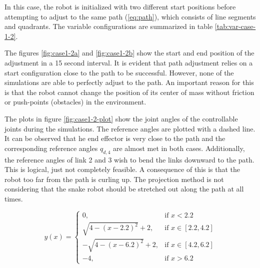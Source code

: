 In this case, the robot is initialized with two different start positions before attempting to adjust to the same path (\ref{eq:path}), which consists of line segments and quadrants. The variable configurations are summarized in table \ref{tab:var-case-1-2}.

The figures \ref{fig:case1-2a} and \ref{fig:case1-2b} show the start and end position of the adjustment in a 15 second interval. It is evident that path adjustment relies on a start configuration close to the path to be successful. However, none of the simulations are able to perfectly adjust to the path. An important reason for this is that the robot cannot change the position of its center of mass without friction or push-points (obstacles) in the environment.

The plots in figure \ref{fig:case1-2-plot} show the joint angles of the controllable joints during the simulations. The reference angles are plotted with a dashed line. It can be observed that he end effector is very close to the path and the corresponding reference angles $q_{d,4}$ are almost met in both cases. Additionally, the reference angles of link 2 and 3 wish to bend the links downward to the path. This is logical, just not completely feasible. A consequence of this is that the robot too far from the path is curling up. The projection method is not considering that the snake robot should be stretched out along the path at all times.

\begin{equation}\label{eq:path}
    y(x) =
    \begin{cases}
        0, & \text{if } x < 2.2 \\
        \sqrt{4 - (x - 2.2)^2} + 2, & \text{if } x \in [2.2, 4.2] \\
        -\sqrt{4 - (x - 6.2)^2} + 2, & \text{if } x \in [4.2, 6.2] \\
        -4, & \text{if } x > 6.2
    \end{cases}
\end{equation}


